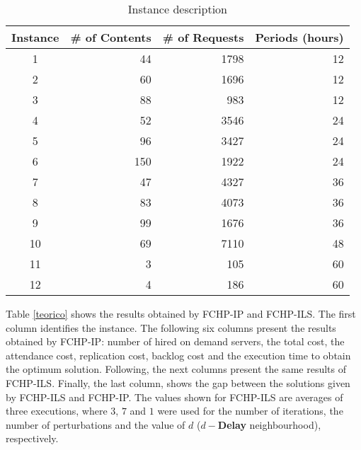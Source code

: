 \begin{table}[htp]
\small
\setlength{\tabcolsep}{3mm}
\caption{Instance description}
\begin{center}
\setlength{\tabcolsep}{0.6mm}
\begin{tabular}{|c|r|r|r|}
\hline 
Instance & \# of Contents  & \# of Requests & Periods (hours) \\
\hline
1	&	44	&	1798		&	12		\\
2	&	60	&	1696		&	12	    \\
3	&	88	&	983	    	&	12		\\
4	&	52	&	3546		&	24		\\
5	&	96	&	3427		&	24		\\
6	&	150	&	1922		&	24		\\
7   &   47  &   4327	    &   36      \\
8   &   83  &   4073        &   36      \\
9   &   99  &   1676        &   36      \\
10   &  69  &   7110 		&   48      \\
11   &   3  &   105         &   60      \\
12   &   4  &   186         &   60      \\
\hline
\end{tabular}
\end{center}
\label{Instance}
\end{table}
	
Table \ref{teorico} shows the results obtained by FCHP-IP and FCHP-ILS. The first column identifies the instance. The following six columns present the results obtained by FCHP-IP: number of hired  on demand servers, the total cost, the attendance cost, replication cost, backlog cost and the execution time to obtain the optimum solution. Following, the next columns present the same results of FCHP-ILS. Finally, the last column, shows the gap between the solutions given by FCHP-ILS and FCHP-IP. The  values shown for FCHP-ILS are averages of three executions, where  $3$, $7$ and $1$ were used for the number of iterations, the number of perturbations and the value of $d$ ({\bf $d-$Delay} neighbourhood), respectively. 


